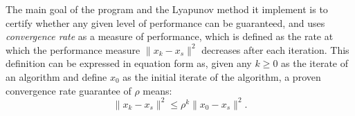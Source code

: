 The main goal of the program and the Lyapunov method it implement is to certify whether any given level of performance can be guaranteed, and uses \textit{convergence rate} as a measure of performance, which is defined as the rate at which the performance measure $\|x_k - x_s\|^2$ decreases after each iteration. This definition can be expressed in equation form as, given any $k \geq 0$ as the iterate of an algorithm and define $x_0$ as the initial iterate of the algorithm, a proven convergence rate guarantee of $\rho$ means:
\begin{equation} \label{eqn:convergence_rate}
	\|x_k - x_s\|^2 \leq \rho^k\|x_0 - x_s\|^2.
\end{equation}

